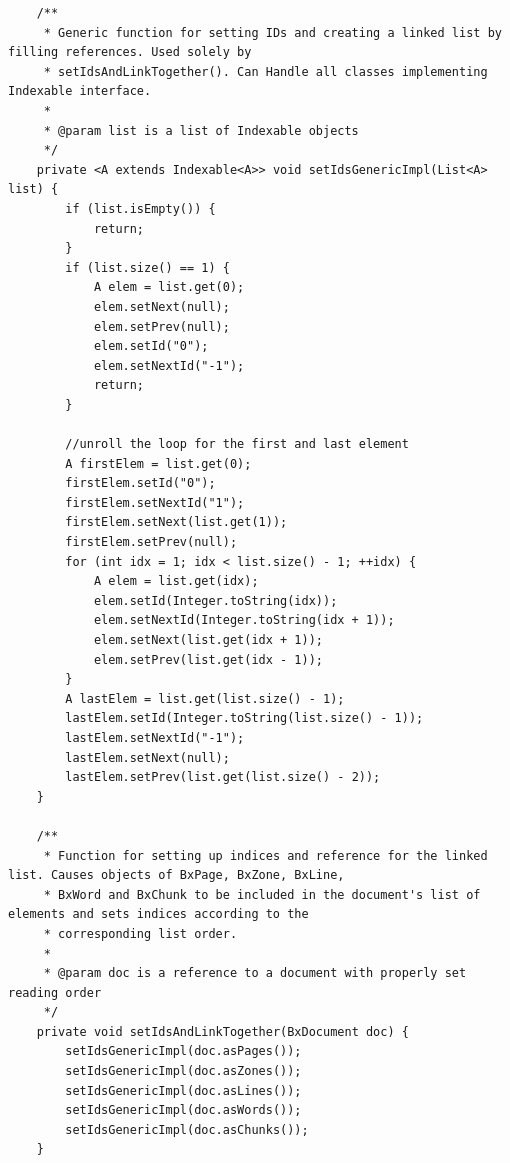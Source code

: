 \begin{appendix}
\begin{lstlisting}
    /**
     * Generic function for setting IDs and creating a linked list by filling references. Used solely by
     * setIdsAndLinkTogether(). Can Handle all classes implementing Indexable interface.
     *
     * @param list is a list of Indexable objects
     */
    private <A extends Indexable<A>> void setIdsGenericImpl(List<A> list) {
        if (list.isEmpty()) {
            return;
        }
        if (list.size() == 1) {
            A elem = list.get(0);
            elem.setNext(null);
            elem.setPrev(null);
            elem.setId("0");
            elem.setNextId("-1");
            return;
        }

        //unroll the loop for the first and last element
        A firstElem = list.get(0);
        firstElem.setId("0");
        firstElem.setNextId("1");
        firstElem.setNext(list.get(1));
        firstElem.setPrev(null);
        for (int idx = 1; idx < list.size() - 1; ++idx) {
            A elem = list.get(idx);
            elem.setId(Integer.toString(idx));
            elem.setNextId(Integer.toString(idx + 1));
            elem.setNext(list.get(idx + 1));
            elem.setPrev(list.get(idx - 1));
        }
        A lastElem = list.get(list.size() - 1);
        lastElem.setId(Integer.toString(list.size() - 1));
        lastElem.setNextId("-1");
        lastElem.setNext(null);
        lastElem.setPrev(list.get(list.size() - 2));
    }

    /**
     * Function for setting up indices and reference for the linked list. Causes objects of BxPage, BxZone, BxLine,
     * BxWord and BxChunk to be included in the document's list of elements and sets indices according to the
     * corresponding list order.
     *
     * @param doc is a reference to a document with properly set reading order
     */
    private void setIdsAndLinkTogether(BxDocument doc) {
        setIdsGenericImpl(doc.asPages());
        setIdsGenericImpl(doc.asZones());
        setIdsGenericImpl(doc.asLines());
        setIdsGenericImpl(doc.asWords());
        setIdsGenericImpl(doc.asChunks());
    }


\end{lstlisting}
\end{appendix}
